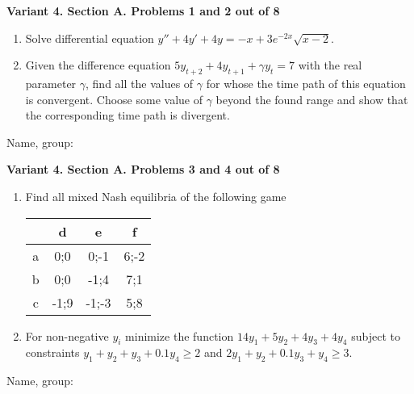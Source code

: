 \documentclass[12pt,a4paper]{article}
\begin{document}
\newpage
\textbf{Variant 4. Section A. Problems 1 and 2 out of 8}

\begin{enumerate}

\item Solve differential equation $y''+4y'+4y=-x+3e^{-2x} \sqrt{x-2} $.

\item Given the difference equation $5y_{t+2} +4y_{t+1} +\gamma y_{t} =7$ with the real parameter $\gamma $, find all the values of  $\gamma$ for whose the time path of this equation is convergent.
Choose some value of $\gamma$ beyond the found range and show that the corresponding time path is divergent.



\end{enumerate}


\begin{framed}
\begin{minipage}{42em}
Name, group:\vspace*{3ex}\par
\noindent\dotfill
\end{minipage}
\end{framed}

\newpage
\textbf{Variant 4. Section A. Problems 3 and 4 out of 8}

\begin{enumerate}[resume]

\item Find all mixed Nash equilibria of the following game

\begin{tabular}{c|ccc}
  & d & e & f \\
\midrule
a & 0;0  & 0;-1 & 6;-2 \\
b & 0;0  & -1;4 & 7;1 \\
c & -1;9 & -1;-3 & 5;8
\end{tabular}

\item For non-negative $y_i$ minimize the function $14y_1 + 5 y_2 + 4y_3 +4y_4$ subject to constraints $y_1 + y_2 + y_3 +0.1y_4 \geq 2$ and $2y_1+y_2+0.1y_3+y_4 \geq 3$.


\end{enumerate}


\begin{framed}
\begin{minipage}{42em}
Name, group:\vspace*{3ex}\par
\noindent\dotfill
\end{minipage}
\end{framed}
\end{document}
